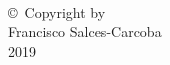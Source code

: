 
\thispagestyle{empty}
\hbox{\ }

\vfill
\renewcommand{\baselinestretch}{1}
\small\normalsize

\vspace{-.65in}

\begin{center}
\large{\copyright \hbox{ }Copyright by\\
Francisco Salces-Carcoba  %
\\
2019}
\end{center}

\vfill
